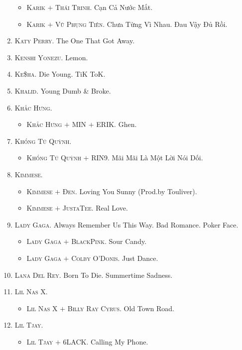 \documentclass{article}
\numberwithin{equation}{section}
\begin{document}
\begin{enumerate}
\begin{itemize}
		\item \textsc{Karik $+$ Thái Trinh.} Cạn Cả Nước Mắt.
		\item \textsc{Karik $+$ Vũ Phụng Tiên.} Chưa Từng Vì Nhau. Đau Vậy Đủ Rồi.
	\end{itemize}	
	\item \textsc{Katy Perry.} The One That Got Away.
	\item \textsc{Kenshi Yonezu.} Lemon.
	\item \textsc{Ke\$ha.} Die Young. TiK ToK.
	\item \textsc{Khalid.} Young Dumb \& Broke.
	\item \textsc{Khắc Hưng.}
	\begin{itemize}
		\item \textsc{Khắc Hưng $+$ MIN $+$ ERIK.} Ghen.
	\end{itemize}
	\item \textsc{Khổng Tú Quỳnh.}
	\begin{itemize}
		\item \textsc{Khổng Tú Quỳnh $+$ RIN9.} Mãi Mãi Là Một Lời Nói Dối.
	\end{itemize}
	\item \textsc{Kimmese.}
	\begin{itemize}
		\item \textsc{Kimmese $+$ Đen.} Loving You Sunny (Prod.by Touliver).
		\item \textsc{Kimmese $+$ JustaTee.} Real Love.
	\end{itemize}
	\item \textsc{Lady Gaga.} Always Remember Us This Way. Bad Romance. Poker Face.
	\begin{itemize}
		\item \textsc{Lady Gaga $+$ BlackPink.} Sour Candy.
		\item \textsc{Lady Gaga $+$ Colby O'Donis.} Just Dance.
	\end{itemize}
	\item \textsc{Lana Del Rey.} Born To Die. Summertime Sadness.
	\item \textsc{Lil Nas X.}
	\begin{itemize}
		\item \textsc{Lil Nas X $+$ Billy Ray Cyrus.} Old Town Road.
	\end{itemize}
	\item \textsc{Lil Tjay.}
	\begin{itemize}
		\item \textsc{Lil Tjay $+$ 6LACK.} Calling My Phone.
	\end{itemize}

\end{enumerate}
\end{document}
